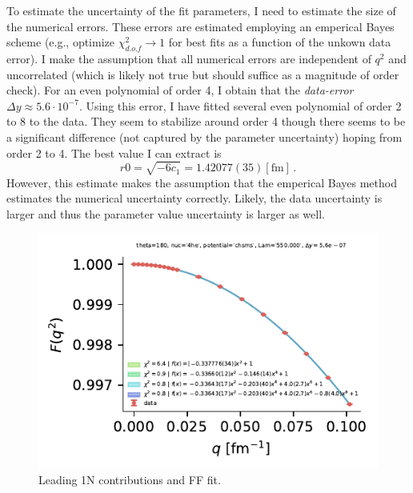 \documentclass[onecolumn]{revtex4-2}
\begin{document}
To estimate the uncertainty of the fit parameters, I need to estimate the size of the numerical errors.
These errors are estimated employing an emperical Bayes scheme (e.g., optimize $\chi^2_{d.o.f} \to 1$ for best fits as a function of the unkown data error).
I make the assumption that all numerical errors are independent of $q^2$ and uncorrelated (which is likely not true but should suffice as a magnitude of order check).
For an even polynomial of order 4, I obtain that the \textit{data-error} $\Delta y \approx 5.6 \cdot 10^{-7}$.
Using this error, I have fitted several even polynomial of order 2 to 8 to the data.
They seem to stabilize around order 4 though there seems to be a significant difference (not captured by the parameter uncertainty) hoping from order 2 to 4.
The best value I can extract is
\begin{equation}
    r0 = \sqrt{-6 c_1}  = 1.42077(35) [\mathrm{fm}]\,.
\end{equation}
However, this estimate makes the assumption that the emperical Bayes method estimates the numerical uncertainty correctly.
Likely, the data uncertainty is larger and thus the parameter value uncertainty is larger as well.

\begin{figure}[htb!]
    \includegraphics{figs/multi-poly-fit.pdf}
    \caption{Leading 1N contributions and FF fit.}
    \label{}
\end{figure}
\end{document}
